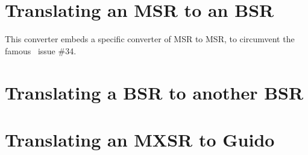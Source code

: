 \section{Translating an MSR to an BSR}

This converter embeds a specific converter of MSR to MSR, to circumvent the famous \lily\ issue \#34.


\section{Translating a BSR to another BSR}


\section{Translating an MXSR to Guido}


